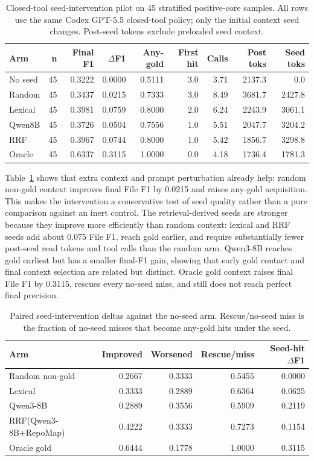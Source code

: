 \documentclass[11pt]{article}
\begin{document}
\begin{table}[t]
\centering
\caption{Closed-tool seed-intervention pilot on 45 stratified positive-core samples. All rows use the same Codex GPT-5.5 closed-tool policy; only the initial context seed changes. Post-seed tokens exclude preloaded seed context.}
\label{tab:seed-intervention}
\small
\begin{tabular}{lrrrrrrrr}
\toprule
Arm & n & Final F1 & \(\Delta\)F1 & Any-gold & First hit & Calls & Post toks & Seed toks \\
\midrule
No seed & 45 & 0.3222 & 0.0000 & 0.5111 & 3.0 & 3.71 & 2137.3 & 0.0 \\
Random & 45 & 0.3437 & 0.0215 & 0.7333 & 3.0 & 8.49 & 3681.7 & 2427.8 \\
Lexical & 45 & 0.3981 & 0.0759 & 0.8000 & 2.0 & 6.24 & 2243.9 & 3061.1 \\
Qwen8B & 45 & 0.3726 & 0.0504 & 0.7556 & 1.0 & 5.51 & 2047.7 & 3204.2 \\
RRF & 45 & 0.3967 & 0.0744 & 0.8000 & 1.0 & 5.42 & 1856.7 & 3298.8 \\
Oracle & 45 & 0.6337 & 0.3115 & 1.0000 & 0.0 & 4.18 & 1736.4 & 1781.3 \\
\bottomrule
\end{tabular}
\end{table}

Table~\ref{tab:seed-intervention} shows that extra context and prompt perturbation already help: random non-gold context improves final File F1 by 0.0215 and raises any-gold acquisition. This makes the intervention a conservative test of seed quality rather than a pure comparison against an inert control. The retrieval-derived seeds are stronger because they improve more efficiently than random context: lexical and RRF seeds add about 0.075 File F1, reach gold earlier, and require substantially fewer post-seed read tokens and tool calls than the random arm. Qwen3-8B reaches gold earliest but has a smaller final-F1 gain, showing that early gold contact and final context selection are related but distinct. Oracle gold context raises final File F1 by 0.3115, rescues every no-seed miss, and still does not reach perfect final precision.

\begin{table}[t]
\centering
\caption{Paired seed-intervention deltas against the no-seed arm. Rescue/no-seed miss is the fraction of no-seed misses that become any-gold hits under the seed.}
\label{tab:seed-intervention-paired}
\small
\begin{tabular}{lrrrr}
\toprule
Arm & Improved & Worsened & Rescue/miss & Seed-hit \(\Delta\)F1 \\
\midrule
Random non-gold & 0.2667 & 0.3333 & 0.5455 & 0.0000 \\
Lexical & 0.3333 & 0.2889 & 0.6364 & 0.0625 \\
Qwen3-8B & 0.2889 & 0.3556 & 0.5909 & 0.2119 \\
RRF(Qwen3-8B+RepoMap) & 0.4222 & 0.3333 & 0.7273 & 0.1154 \\
Oracle gold & 0.6444 & 0.1778 & 1.0000 & 0.3115 \\
\bottomrule
\end{tabular}
\end{table}
\end{document}
